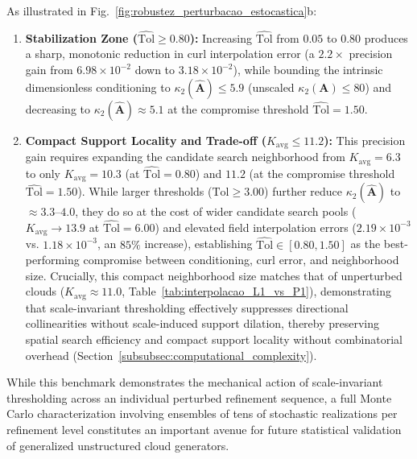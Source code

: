 \documentclass[preprint,12pt]{elsarticle}
\begin{document}
As illustrated in Fig.~\ref{fig:robustez_perturbacao_estocastica}b:
\begin{enumerate}
    \item \textbf{Stabilization Zone ($\widehat{\mathrm{Tol}} \ge 0.80$):} Increasing $\widehat{\mathrm{Tol}}$ from $0.05$ to $0.80$ produces a sharp, monotonic reduction in curl interpolation error (a $2.2\times$ precision gain from $6.98 \times 10^{-2}$ down to $3.18 \times 10^{-2}$), while bounding the intrinsic dimensionless conditioning to $\kappa_2(\widehat{\mathbf{A}}) \le 5.9$ (unscaled $\kappa_2(\mathbf{A}) \le 80$) and decreasing to $\kappa_2(\widehat{\mathbf{A}}) \approx 5.1$ at the compromise threshold $\widehat{\mathrm{Tol}} = 1.50$.
    \item \textbf{Compact Support Locality and Trade-off ($K_{\mathrm{avg}} \le 11.2$):} This precision gain requires expanding the candidate search neighborhood from $K_{\mathrm{avg}} = 6.3$ to only $K_{\mathrm{avg}} = 10.3$ (at $\widehat{\mathrm{Tol}} = 0.80$) and $11.2$ (at the compromise threshold $\widehat{\mathrm{Tol}} = 1.50$). While larger thresholds ($\widehat{\mathrm{Tol}} \ge 3.00$) further reduce $\kappa_2(\widehat{\mathbf{A}})$ to $\approx 3.3\text{--}4.0$, they do so at the cost of wider candidate search pools ($K_{\mathrm{avg}} \to 13.9$ at $\widehat{\mathrm{Tol}} = 6.00$) and elevated field interpolation errors ($2.19 \times 10^{-3}$ vs. $1.18 \times 10^{-3}$, an $85\%$ increase), establishing $\widehat{\mathrm{Tol}} \in [0.80, 1.50]$ as the best-performing compromise between conditioning, curl error, and neighborhood size. Crucially, this compact neighborhood size matches that of unperturbed clouds ($K_{\mathrm{avg}} \approx 11.0$, Table~\ref{tab:interpolacao_L1_vs_P1}), demonstrating that scale-invariant thresholding effectively suppresses directional collinearities without scale-induced support dilation, thereby preserving spatial search efficiency and compact support locality without combinatorial overhead (Section~\ref{subsubsec:computational_complexity}).
\end{enumerate}

While this benchmark demonstrates the mechanical action of scale-invariant thresholding across an individual perturbed refinement sequence, a full Monte Carlo characterization involving ensembles of tens of stochastic realizations per refinement level constitutes an important avenue for future statistical validation of generalized unstructured cloud generators.


\end{document}
